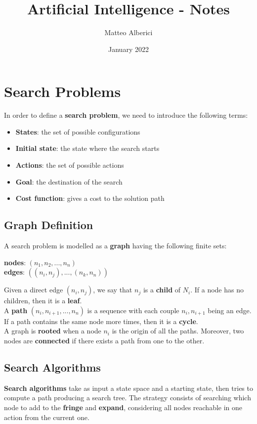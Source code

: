 \documentclass{article}
\title{Artificial Intelligence - Notes}
\author{Matteo Alberici}
\date{January 2022}
\begin{document}
\maketitle
\newpage
\tableofcontents
\newpage

\section{Search Problems}
In order to define a \textbf{search problem}, we need to introduce the following terms:
\begin{itemize}
    \item \textbf{States}: the set of possible configurations
    \item \textbf{Initial state}: the state where the search starts
    \item \textbf{Actions}: the set of possible actions
    \item \textbf{Goal}: the destination of the search
    \item \textbf{Cost function}: gives a cost to the solution path
\end{itemize}
\subsection{Graph Definition}
A search problem is modelled as a \textbf{graph} having the following finite sets:
\begin{center}
    \textbf{nodes}: $(n_1, n_2, ..., n_n)$ \\
    \vspace{0.2cm}
    \textbf{edges}: $((n_i, n_j), ..., (n_k, n_n))$
\end{center}
Given a direct edge $(n_i, n_j)$, we say that $n_j$ is a \textbf{child} of $N_i$. If a node has no children, then it is a \textbf{leaf}. \\
A \textbf{path} $(n_i, n_{i+1}, ..., n_n)$ is a sequence with each couple $n_i, n_{i+1}$ being an edge. If a path contains the same node more times, then it is a \textbf{cycle}. \\
A graph is \textbf{rooted} when a node $n_i$ is the origin of all the paths. Moreover, two nodes are \textbf{connected} if there exists a path from one to the other.
\subsection{Search Algorithms}
\textbf{Search algorithms} take as input a state space and a starting state, then tries to compute a path producing a search tree. The strategy consists of searching which node to add to the \textbf{fringe} and \textbf{expand}, considering all nodes reachable in one action from the current one.
\end{document}
